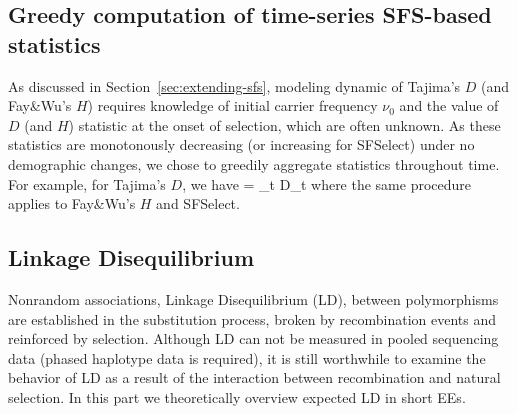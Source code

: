 \documentclass[11pt]{article}
\begin{document}
\subsection{Greedy computation of time-series SFS-based  
statistics}\label{app:agg}
As discussed in Section~\ref{sec:extending-sfs}, modeling dynamic of Tajima's 
$D$ (and Fay\&Wu's $H$) requires knowledge of initial carrier frequency $\nu_0$ 
and the value of $D$ (and $H$) statistic at the onset of selection, which are 
often unknown.
As these statistics are monotonously decreasing (or increasing for SFSelect) 
under no demographic changes, we chose to greedily aggregate statistics 
throughout time. For example, for Tajima's $D$, we have 
\beq
\Dc = \sum_{t \in \Tc} D_t
\eeq
where the same procedure applies to Fay\&Wu's $H$ and SFSelect.


\subsection{Linkage Disequilibrium}
Nonrandom associations, Linkage Disequilibrium (LD), between 
polymorphisms are established in the 
substitution process, broken by recombination events 
and reinforced by selection. 
Although LD can not be measured in pooled sequencing data (phased 
haplotype data is required), it is still worthwhile 
to examine the behavior of LD as a result of the interaction between 
recombination and natural selection. In this part we theoretically overview 
expected LD in short EEs.
\end{document}
